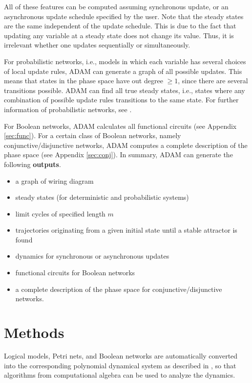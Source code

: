 \documentclass[11pt]{amsart}
\begin{document}
All of these features can be computed assuming synchronous update, or an asynchronous update schedule specified by the user. Note that the steady states are the same independent of the update schedule. This is due to the fact that updating any variable at a steady state does not change its value. Thus, it is irrelevant whether one updates sequentially or simultaneously.  

%
%

For probabilistic networks, i.e., models in which each variable has several choices of local update rules, ADAM can generate a graph of all possible updates. This means that states in the phase space have out degree $\geq 1$, since there are several transitions possible. ADAM can find all true  steady states, i.e., states where any combination of possible update rules transitions to the same state. For further information of probabilistic networks, see \cite{shmulevich}.

For Boolean networks, ADAM calculates all functional circuits (see Appendix \ref{sec:func}). For a certain class of Boolean networks, namely conjunctive/disjunctive networks, ADAM computes a complete description of the phase space (see Appendix \ref{sec:conj}).
In summary, ADAM can generate the following {\bf outputs}.
\begin{itemize}
\item a graph of wiring diagram
\item steady states (for deterministic and probabilistic systems)
\item limit cycles of specified length $m$
\item trajectories originating from a given initial state until a stable
attractor is found
\item dynamics for synchronous or asynchronous updates
\item functional circuits for Boolean networks
\item a complete description of the phase space for conjunctive/disjunctive
networks.
\end{itemize}
\section{Methods}
Logical models, Petri nets, and Boolean networks are automatically converted
into the corresponding polynomial dynamical system as described in
\cite{Alan:Bioinf2010}, so that algorithms from computational
algebra can be used to analyze the dynamics.
\end{document}
